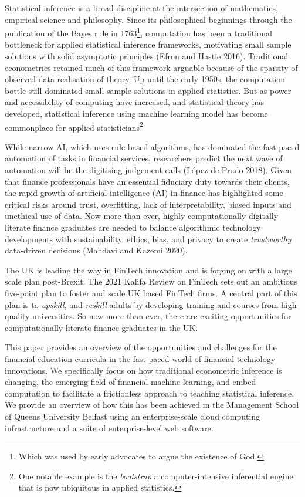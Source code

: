 \documentclass{article}
\begin{document}
Statistical inference is a broad discipline at the intersection of
mathematics, empirical science and philosophy. Since its philosophical
beginnings through the publication of the Bayes rule in 1763\footnote{Which
  was used by early advocates to argue the existence of God.},
computation has been a traditional bottleneck for applied statistical
inference frameworks, motivating small sample solutions with solid
asymptotic principles (Efron and Hastie 2016). Traditional econometrics
retained much of this framework arguable because of the sparsity of
observed data realisation of theory. Up until the early 1950s, the
computation bottle still dominated small sample solutions in applied
statistics. But as power and accessibility of computing have increased,
and statistical theory has developed, statistical inference using
machine learning model has become commonplace for applied
statisticians\footnote{One notable example is the \emph{bootstrap} a
  computer-intensive inferential engine that is now ubiquitous in
  applied statistics.}

While narrow AI, which uses rule-based algorithms, has dominated the
fast-paced automation of tasks in financial services, researchers
predict the next wave of automation will be the digitising judgement
calls (López de Prado 2018). Given that finance professionals have an
essential fiduciary duty towards their clients, the rapid growth of
artificial intelligence (AI) in finance has highlighted some critical
risks around trust, overfitting, lack of interpretability, biased inputs
and unethical use of data. Now more than ever, highly computationally
digitally literate finance graduates are needed to balance algorithmic
technology developments with sustainability, ethics, bias, and privacy
to create \emph{trustworthy} data-driven decisions (Mahdavi and Kazemi
2020).

The UK is leading the way in FinTech innovation and is forging on with a
large scale plan post-Brexit. The 2021 Kalifa Review on FinTech sets out
an ambitious five-point plan to foster and scale UK based FinTech firms.
A central part of this plan is to \emph{upskill}, and \emph{reskill}
adults by developing training and courses from high-quality
universities. So now more than ever, there are exciting opportunities
for computationally literate finance graduates in the UK.

This paper provides an overview of the opportunities and challenges for
the financial education curricula in the fast-paced world of financial
technology innovations. We specifically focus on how traditional
econometric inference is changing, the emerging field of financial
machine learning, and embed computation to facilitate a frictionless
approach to teaching statistical inference. We provide an overview of
how this has been achieved in the Management School of Queens University
Belfast using an enterprise-scale cloud computing infrastructure and a
suite of enterprise-level web software.
\end{document}

